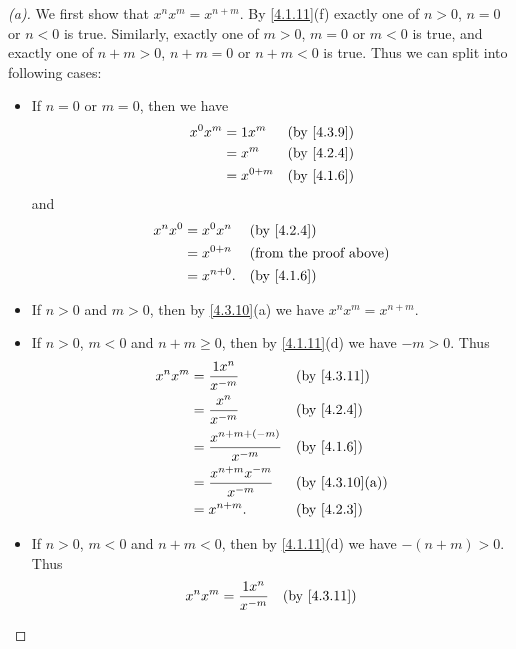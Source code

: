 \begin{proof}[(a)]
  We first show that \(x^n x^m = x^{n + m}\).
  By \cref{4.1.11}(f) exactly one of \(n > 0\), \(n = 0\) or \(n < 0\) is true.
  Similarly, exactly one of \(m > 0\), \(m = 0\) or \(m < 0\) is true, and exactly one of \(n + m > 0\), \(n + m = 0\) or \(n + m < 0\) is true.
  Thus we can split into following cases:
  \begin{itemize}
    \item If \(n = 0\) or \(m = 0\), then we have
          \begin{align*}
            x^0 x^m & = 1 x^m     &  & \by{4.3.9} \\
                    & = x^m       &  & \by{4.2.4} \\
                    & = x^{0 + m} &  & \by{4.1.6}
          \end{align*}
          and
          \begin{align*}
            x^n x^0 & = x^0 x^n    &  & \by{4.2.4}                    \\
                    & = x^{0 + n}  &  & \text{(from the proof above)} \\
                    & = x^{n + 0}. &  & \by{4.1.6}
          \end{align*}
    \item If \(n > 0\) and \(m > 0\), then by \cref{4.3.10}(a) we have \(x^n x^m = x^{n + m}\).
    \item If \(n > 0\), \(m < 0\) and \(n + m \geq 0\), then by \cref{4.1.11}(d) we have \(-m > 0\).
          Thus
          \begin{align*}
            x^n x^m & = \dfrac{1 x^n}{x^{-m}}            &  & \by{4.3.11}    \\
                    & = \dfrac{x^n}{x^{-m}}              &  & \by{4.2.4}     \\
                    & = \dfrac{x^{n + m + (-m)}}{x^{-m}} &  & \by{4.1.6}     \\
                    & = \dfrac{x^{n + m} x^{-m}}{x^{-m}} &  & \by{4.3.10}[a] \\
                    & = x^{n + m}.                       &  & \by{4.2.3}
          \end{align*}
    \item If \(n > 0\), \(m < 0\) and \(n + m < 0\), then by \cref{4.1.11}(d) we have \(-(n + m) > 0\).
          Thus
          \begin{align*}
            x^n x^m & = \dfrac{1 x^n}{x^{-m}}              &  & \by{4.3.11}    \\

\end{align*}
\end{itemize}
\end{proof}
